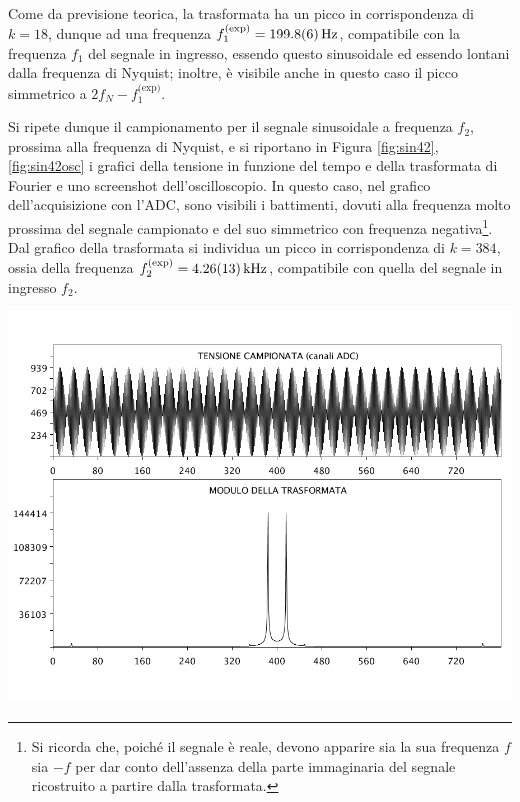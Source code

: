 \documentclass[10pt,oneside,a4paper]{article}
\newenvironment{Figure}
  {\par\medskip\noindent\minipage{\linewidth}}
  {\endminipage\par\medskip}
\begin{document}
\begin{multicols}{2}
Come da previsione teorica, la trasformata ha un picco in corrispondenza di $k=18$, dunque ad una frequenza $f_1^\text{(exp)} = \SI{199.8 \pm 0.6}{\Hz}$, compatibile con la frequenza $f_1$ del segnale in ingresso, essendo questo sinusoidale ed essendo lontani dalla frequenza di Nyquist; inoltre, è visibile anche in questo caso il picco simmetrico a $2f_N - f_1^\text{(exp)}$.

Si ripete dunque il campionamento per il segnale sinusoidale a frequenza $f_2$, prossima alla frequenza di Nyquist, e si riportano in Figura \ref{fig:sin42}, \ref{fig:sin42osc} i grafici della tensione in funzione del tempo e della trasformata di Fourier e uno screenshot dell'oscilloscopio. In questo caso, nel grafico dell'acquisizione con l'ADC, sono visibili i battimenti, dovuti alla frequenza molto prossima del segnale campionato e del suo simmetrico con frequenza negativa\footnote{Si ricorda che, poiché il segnale è reale, devono apparire sia la sua frequenza $f$ sia $-f$ per dar conto dell'assenza della parte immaginaria del segnale ricostruito a partire dalla trasformata.}. Dal grafico della trasformata si individua un picco in corrispondenza di $k = 384$, ossia della frequenza $f_2^\text{(exp)} = \SI{4.26 \pm 0.13}{\kilo\Hz}$, compatibile con quella del segnale in ingresso $f_2$.

\begin{Figure}
	\begin{center}
	\includegraphics[width=\linewidth]{sin42}
	\label{fig:sin42}
	\end{center}
\end{Figure}


\end{multicols}
\end{document}
